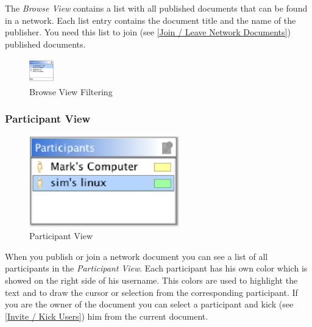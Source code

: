 \documentclass[11pt,a4paper]{article}
\begin{document}
The \textit{Browse View} contains a list with all published documents that can be found in a network. Each list entry contains the document title and the name of the publisher. You need this list to join (see \ref{Join / Leave Network Documents}) published documents.

\begin{figure}[H]
\begin{center}
  \includegraphics[height=30pt, width=30pt]{../images/usermanual/bview_filtering.bmp.eps}
\caption{Browse View Filtering}
\label{default}
\end{center}
\end{figure}

\subsubsection{Participant View}

\begin{figure}[H]
\begin{center}
  \includegraphics[height=1.56in, width=2.56in]{../images/usermanual/pview_overview.bmp.eps}
\caption{Participant View}
\label{default}
\end{center}
\end{figure}

When you publish or join a network document you can see a list of all participants in the \textit{Participant View}. Each participant has his own color which is showed on the right side of his username. This colors are used to highlight the text and to draw the cursor or selection from the corresponding participant. If you are the owner of the document you can select a participant and kick (see \ref{Invite / Kick Users}) him from the current document.

\end{document}
